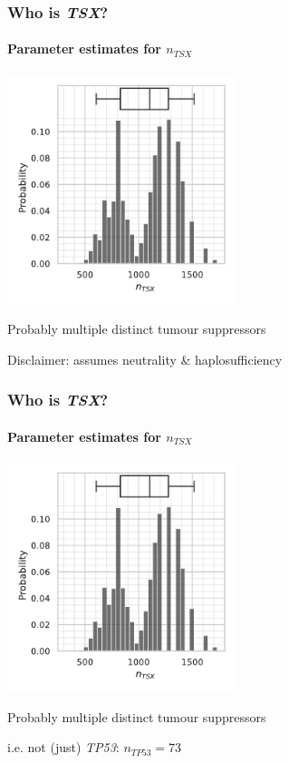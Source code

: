 \documentclass{beamer}
\begin{document}
\begin{frame}
    \frametitle{Who is \emph{TSX}?}
    \framesubtitle{Parameter estimates for $n_{TSX}$}

    \begin{center}
        \includegraphics[width=0.5\textwidth]{figures/TSXhistogram}
    \end{center}

    \begin{center}
        \small{Probably multiple distinct tumour suppressors} 

        \;

        \small{Disclaimer: assumes neutrality \& haplosufficiency}
    \end{center}

\end{frame}

\begin{frame}
    \frametitle{Who is \emph{TSX}?}
    \framesubtitle{Parameter estimates for $n_{TSX}$}

    \begin{center}
        \includegraphics[width=0.5\textwidth]{figures/TSXhistogram}
    \end{center}

    \begin{center}
        \small{Probably multiple distinct tumour suppressors} 

        \;

        \huge{i.e. not (just) \emph{TP53}: $n_{TP53} = 73$}

    \end{center}

\end{frame}
\end{document}
